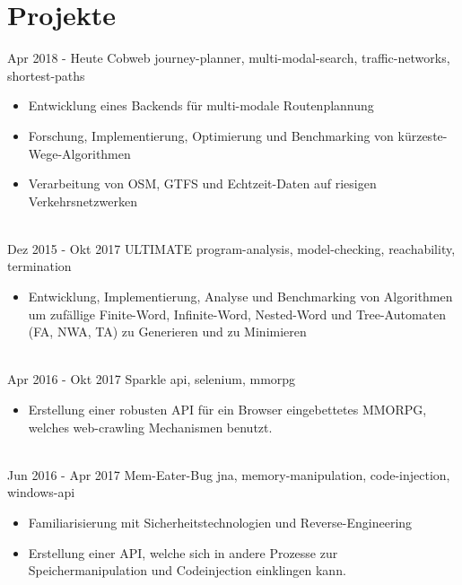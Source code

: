 \documentclass[letterpaper]{twentysecondcv_german} %
\begin{document}
\section{Projekte}
\begin{twenty} %
	\twentyitem
    		{Apr 2018 -}
		{Heute}
        		{Cobweb}
        		{}
        		{journey-planner, multi-modal-search, traffic-networks, shortest-paths}
        		{\begin{itemize}
        			\item Entwicklung eines Backends für multi-modale Routenplannung
        			\item Forschung, Implementierung, Optimierung und Benchmarking von kürzeste-Wege-Algorithmen
        			\item Verarbeitung von OSM, GTFS und Echtzeit-Daten auf riesigen Verkehrsnetzwerken
        		\end{itemize}}\\
	\twentyitem
    		{Dez 2015 -}
		{Okt 2017}
        		{ULTIMATE}
        		{}
        		{program-analysis, model-checking, reachability, termination}
        		{\begin{itemize}
        			\item Entwicklung, Implementierung, Analyse und Benchmarking von Algorithmen um zufällige
        			Finite-Word, Infinite-Word, Nested-Word und Tree-Automaten (FA, NWA, TA) zu Generieren und zu Minimieren
        		\end{itemize}}\\
	\twentyitem
    		{Apr 2016 -}
		{Okt 2017}
        		{Sparkle}
        		{}
        		{api, selenium, mmorpg}
        		{\begin{itemize}
        			\item Erstellung einer robusten API für ein Browser eingebettetes MMORPG, welches web-crawling Mechanismen benutzt.
        		\end{itemize}}\\
	\twentyitem
    		{Jun 2016 -}
		{Apr 2017}
        		{Mem-Eater-Bug}
        		{}
        		{jna, memory-manipulation, code-injection, windows-api}
        		{\begin{itemize}
        			\item Familiarisierung mit Sicherheitstechnologien und Reverse-Engineering
        			\item Erstellung einer API, welche sich in andere Prozesse zur Speichermanipulation und Codeinjection einklingen kann.
        		\end{itemize}}\\

\end{twenty}
\end{document}
